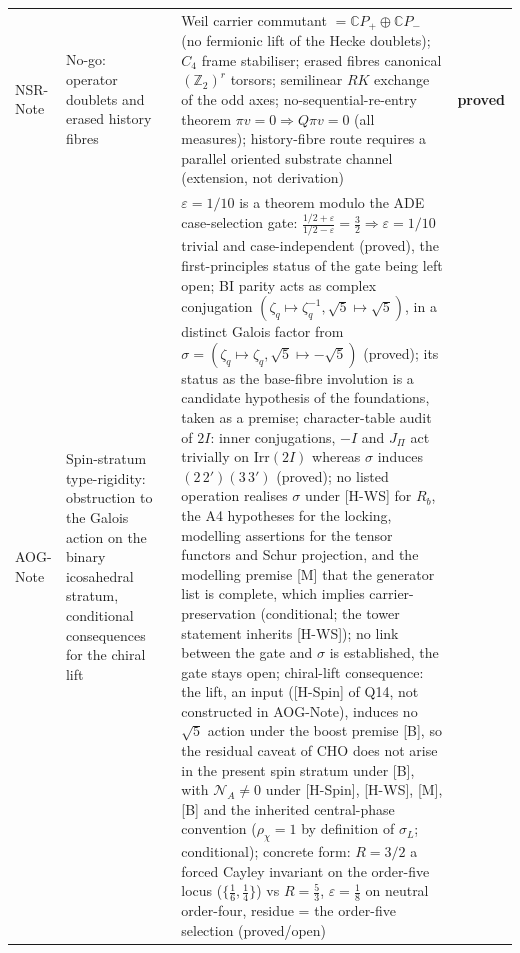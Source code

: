 \documentclass[11pt,a4paper]{article}
\newcommand{\sproved}{\textcolor{cproved}{\textbf{proved}}}
\begin{document}
\begin{longtable}{@{}p{1.70cm}p{2.9cm}p{1.3cm}p{6.25cm}>{\raggedright\arraybackslash}p{2.0cm}@{}}
      NSR-Note & No-go: operator doublets and erased history fibres & \cite{Beau2026nsr} &
      Weil carrier commutant $= \mathbb{C}P_+ \oplus \mathbb{C}P_-$ (no fermionic lift of
      the Hecke doublets); $C_4$ frame stabiliser; erased fibres canonical
      $(\mathbb{Z}_2)^r$ torsors; semilinear $RK$ exchange of the odd axes;
      no-sequential-re-entry theorem $\pi v = 0 \Rightarrow Q\pi v = 0$ (all measures);
      history-fibre route requires a parallel oriented substrate channel (extension, not
      derivation) &
      \sproved \\[3pt]
      AOG-Note & Spin-stratum type-rigidity: obstruction to the Galois action on the binary icosahedral stratum,
      conditional consequences for the chiral lift & \cite{Beau2026aog} &
      $\varepsilon = 1/10$ is a theorem modulo the ADE case-selection gate:
      $\tfrac{1/2+\varepsilon}{1/2-\varepsilon} = \tfrac{3}{2} \Rightarrow \varepsilon = 1/10$ trivial and
      case-independent (proved), the first-principles status of the gate being left open;
      BI parity acts as complex conjugation $(\zeta_q\mapsto\zeta_q^{-1},\sqrt{5}\mapsto\sqrt{5})$, in a distinct Galois
      factor from $\sigma=(\zeta_q\mapsto\zeta_q,\sqrt{5}\mapsto-\sqrt{5})$ (proved); its status as the base-fibre
      involution is a candidate hypothesis of the foundations, taken as a premise;
      character-table audit of $2I$: inner conjugations, $-I$ and $J_\Pi$ act trivially on $\mathrm{Irr}(2I)$ whereas
      $\sigma$ induces $(2\,2')(3\,3')$ (proved); no listed operation realises $\sigma$ under [H-WS] for $R_b$, the A4
      hypotheses for the locking, modelling assertions for the tensor functors and Schur projection, and the
      modelling premise [M] that the generator list is complete, which implies carrier-preservation (conditional; the
      tower statement inherits [H-WS]); no link between the gate and $\sigma$
      is established, the gate stays open;
      chiral-lift consequence: the lift, an input ([H-Spin] of Q14, not constructed in AOG-Note), induces no
      $\sqrt{5}$ action under the boost premise [B], so the residual caveat of CHO does not arise in the present spin
      stratum under [B], with
      $\mathcal{N}_A\neq0$ under [H-Spin], [H-WS], [M], [B] and the inherited central-phase convention ($\rho_\chi=1$ by
      definition of $\sigma_L$; conditional);
      concrete form: $R=3/2$ a forced Cayley invariant on the order-five locus ($\{\tfrac16,\tfrac14\}$) vs
      $R=\tfrac53$,
      $\varepsilon=\tfrac18$ on neutral order-four, residue = the order-five selection (proved/open) &

\end{longtable}
\end{document}
